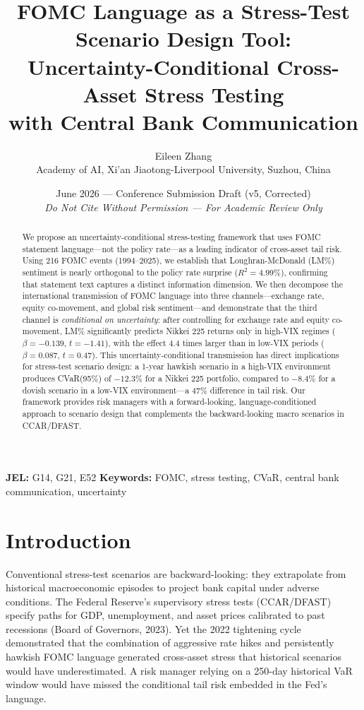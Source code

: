 \documentclass[11pt]{article}
\title{\textbf{FOMC Language as a Stress-Test Scenario Design Tool:}\\[6pt]
Uncertainty-Conditional Cross-Asset Stress Testing\\
with Central Bank Communication}
\author{Eileen Zhang\\[4pt]
\small Academy of AI, Xi'an Jiaotong-Liverpool University, Suzhou, China}
\date{June 2026 --- Conference Submission Draft (v5, Corrected)\\[2pt]
\small\textit{Do Not Cite Without Permission --- For Academic Review Only}}
\begin{document}
\maketitle

\begin{abstract}
We propose an uncertainty-conditional stress-testing framework that uses FOMC statement language---not the policy rate---as a leading indicator of cross-asset tail risk.
Using 216 FOMC events (1994--2025), we establish that Loughran-McDonald (LM\%) sentiment is nearly orthogonal to the policy rate surprise ($R^2 = 4.99\%$), confirming that statement text captures a distinct information dimension.
We then decompose the international transmission of FOMC language into three channels---exchange rate, equity co-movement, and global risk sentiment---and demonstrate that the third channel is \textit{conditional on uncertainty}: after controlling for exchange rate and equity co-movement, LM\% significantly predicts Nikkei 225 returns only in high-VIX regimes ($\beta = -0.139$, $t = -1.41$), with the effect 4.4 times larger than in low-VIX periods ($\beta = 0.087$, $t = 0.47$).
This uncertainty-conditional transmission has direct implications for stress-test scenario design: a 1-year hawkish scenario in a high-VIX environment produces CVaR(95\%) of $-12.3\%$ for a Nikkei 225 portfolio, compared to $-8.4\%$ for a dovish scenario in a low-VIX environment---a 47\% difference in tail risk.
Our framework provides risk managers with a forward-looking, language-conditioned approach to scenario design that complements the backward-looking macro scenarios in CCAR/DFAST.
\end{abstract}

\medskip
\noindent\textbf{JEL:} G14, G21, E52 \quad \textbf{Keywords:} FOMC, stress testing, CVaR, central bank communication, uncertainty

\newpage

\section{Introduction}

Conventional stress-test scenarios are backward-looking: they extrapolate from historical macroeconomic episodes to project bank capital under adverse conditions. The Federal Reserve's supervisory stress tests (CCAR/DFAST) specify paths for GDP, unemployment, and asset prices calibrated to past recessions (Board of Governors, 2023). Yet the 2022 tightening cycle demonstrated that the combination of aggressive rate hikes and persistently hawkish FOMC language generated cross-asset stress that historical scenarios would have underestimated. A risk manager relying on a 250-day historical VaR window would have missed the conditional tail risk embedded in the Fed's language.
\end{document}
